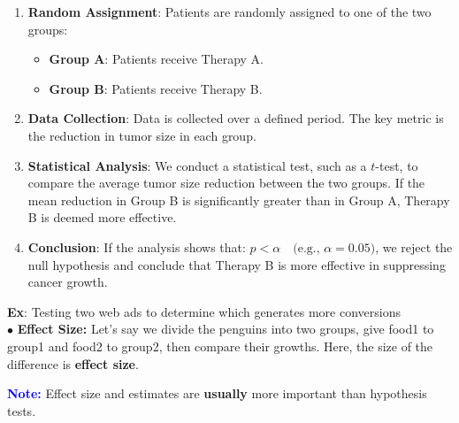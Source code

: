 \documentclass[letterpaper, 10.5pt,landscape]{article}
\begin{document}
\begin{multicols*}{3}
\begin{enumerate}
    \item \textbf{Random Assignment}:
    Patients are randomly assigned to one of the two groups:
    \vspace{-2pt}
    \begin{itemize}
    \vspace{-2pt}
        \item \textbf{Group A}: Patients receive Therapy A.
        \vspace{-2pt}
        \item \textbf{Group B}: Patients receive Therapy B.
        \vspace{-2pt}
    \end{itemize}


    \item \textbf{Data Collection}: Data is collected over a defined period. The key metric is the reduction in tumor size in each group.

    \item \textbf{Statistical Analysis}: We conduct a statistical test, such as a $t$-test, to compare the average tumor size reduction between the two groups. If the mean reduction in Group B is significantly greater than in Group A, Therapy B is deemed more effective.
    
    \item \textbf{Conclusion}: If the analysis shows that: \(\boxed{p < \alpha} \quad \text{(e.g., } \alpha = 0.05 \text{)}\), 
we reject the null hypothesis and conclude that Therapy B is more effective in suppressing cancer growth.

\end{enumerate}









\textbf{Ex}: Testing two web ads to determine which generates more conversions \\

\vspace{3pt}
$\bullet$ \textbf{Effect Size:} Let's say we divide the penguins into two groups, give food1 to group1 and food2 to group2, then compare their growths. Here, the size of the difference is \textbf{effect size}.

\textbf{\textcolor{blue}{Note:}} Effect size and estimates are \textbf{usually} more important than hypothesis tests.




\end{multicols*}
\end{document}
